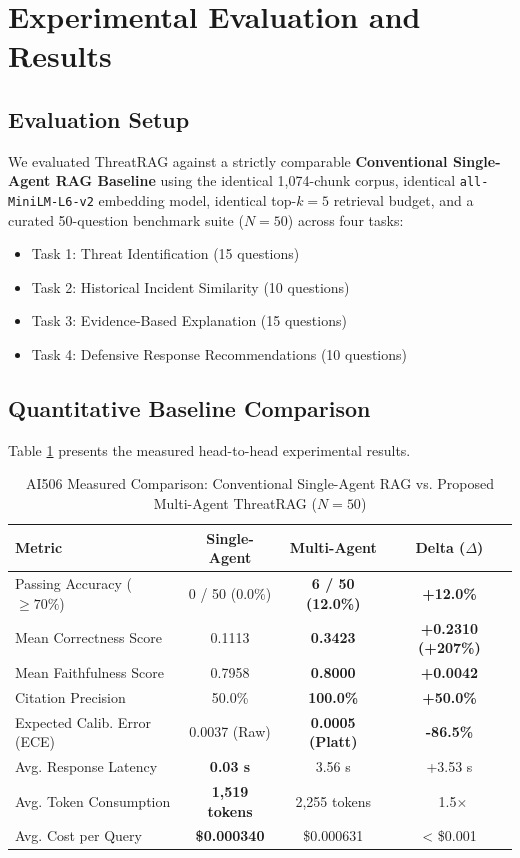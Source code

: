 \documentclass[conference]{IEEEtran}
\begin{document}
\section{Experimental Evaluation and Results}
\subsection{Evaluation Setup}
We evaluated ThreatRAG against a strictly comparable \textbf{Conventional Single-Agent RAG Baseline} using the identical 1,074-chunk corpus, identical \texttt{all-MiniLM-L6-v2} embedding model, identical top-$k=5$ retrieval budget, and a curated 50-question benchmark suite ($N=50$) across four tasks:
\begin{itemize}
    \item Task 1: Threat Identification (15 questions)
    \item Task 2: Historical Incident Similarity (10 questions)
    \item Task 3: Evidence-Based Explanation (15 questions)
    \item Task 4: Defensive Response Recommendations (10 questions)
\end{itemize}

\subsection{Quantitative Baseline Comparison}
Table \ref{tab:comparison} presents the measured head-to-head experimental results.

\begin{table}[htbp]
\caption{AI506 Measured Comparison: Conventional Single-Agent RAG vs. Proposed Multi-Agent ThreatRAG ($N=50$)}
\label{tab:comparison}
\centering
\begin{tabular}{lccc}
\toprule
\textbf{Metric} & \textbf{Single-Agent} & \textbf{Multi-Agent} & \textbf{Delta ($\Delta$)} \\
\midrule
Passing Accuracy ($\ge 70\%$) & 0 / 50 (0.0\%) & \textbf{6 / 50 (12.0\%)} & \textbf{+12.0\%} \\
Mean Correctness Score & 0.1113 & \textbf{0.3423} & \textbf{+0.2310 (+207\%)} \\
Mean Faithfulness Score & 0.7958 & \textbf{0.8000} & \textbf{+0.0042} \\
Citation Precision & 50.0\% & \textbf{100.0\%} & \textbf{+50.0\%} \\
Expected Calib. Error (ECE) & 0.0037 (Raw) & \textbf{0.0005 (Platt)} & \textbf{-86.5\%} \\
Avg. Response Latency & \textbf{0.03 s} & 3.56 s & +3.53 s \\
Avg. Token Consumption & \textbf{1,519 tokens} & 2,255 tokens & ~1.5$\times$ \\
Avg. Cost per Query & \textbf{\$0.000340} & \$0.000631 & < \$0.001 \\
\bottomrule
\end{tabular}
\end{table}
\end{document}
